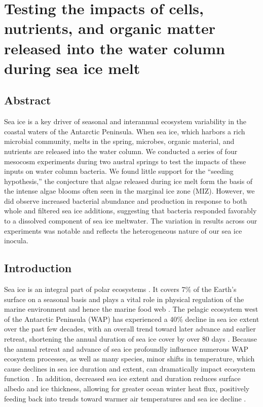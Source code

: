 
\chapter{Testing the impacts of cells, nutrients, and organic matter released into the water column during sea ice melt}\label{ch:seaice}




\section{Abstract}

Sea ice is a key driver of seasonal and interannual ecosystem variability in the coastal waters of the Antarctic Peninsula. When sea ice, which harbors a rich microbial community, melts in the spring, microbes, organic material, and nutrients are released into the water column. We conducted a series of four mesocosm experiments during two austral springs to test the impacts of these inputs on water column bacteria. We found little support for the ``seeding hypothesis,'' the conjecture that algae released during ice melt form the basis of the intense algae blooms often seen in the marginal ice zone (MIZ). However, we did observe increased bacterial abundance and production in response to both whole and filtered sea ice additions, suggesting that bacteria responded favorably to a dissolved component of sea ice meltwater. The variation in results across our experiments was notable and reflects the heterogeneous nature of our sea ice inocula. 

\section{Introduction}

Sea ice is an integral part of polar ecosystems \citep{thomas2003sea, wywabdlc13}. It covers 7\% of the Earth's surface on a seasonal basis and plays a vital role in physical regulation of the marine environment and hence the marine food web \citep{Maycut1985-ng}. The pelagic ecosystem west of the Antarctic Peninsula (WAP) has experienced a 40\% decline in sea ice extent over the past few decades, with an overall trend toward later advance and earlier retreat, shortening the annual duration of sea ice cover by over 80 days \citep{Stammerjohn2008-nj}. Because the annual retreat and advance of sea ice profoundly influence numerous WAP ecosystem processes, as well as many species, minor shifts in temperature, which cause declines in sea ice duration and extent, can dramatically impact ecosystem function \citep{Clarke2008-zv}. In addition, decreased sea ice extent and duration reduces surface albedo and ice thickness, allowing for greater ocean winter heat flux, positively feeding back into trends toward warmer air temperatures and sea ice decline \citep{Ducklow2007-ns}.

